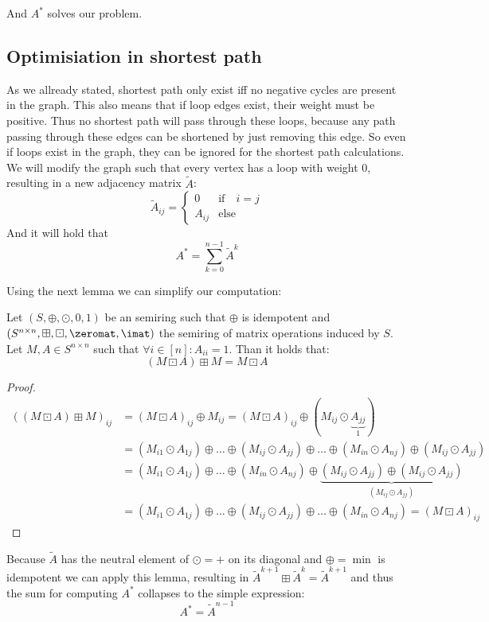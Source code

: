 And $A^*$ solves our problem.

\subsection{Optimisiation in shortest path}
As we allready stated, shortest path only exist iff no negative cycles are present in the graph. This also means that if loop edges exist, their weight must be positive. Thus no shortest path will pass through these loops, because any path passing through these edges can be shortened by just removing this edge. So even if loops exist in the graph, they can be ignored for the shortest path calculations. We will modify the graph such that every vertex has a loop with weight 0, resulting in a new adjacency matrix $\tilde A$:
$$\tilde A_{ij} = \begin{cases}
    0  &\textrm{if}\quad i = j\\
    A_{ij} &\textrm{else}
\end{cases}$$
And it will hold that
$$A^* = \sum_{k=0}^{n-1}\tilde A^k$$

Using the next lemma we can simplify our computation:
\begin{lemma}
    Let $(S, \oplus, \odot, 0, 1)$ be an semiring such that $\oplus$ is idempotent and $(S^{n \times n}, \boxplus, \boxdot, \zeromat, \imat)$ the semiring of matrix operations induced by $S$. Let $M, A \in S^{n \times n}$ such that $\forall i \in [n]: A_{ii} = 1$. Than it holds that:
    $$(M \boxdot A) \boxplus M = M \boxdot A$$ 
\end{lemma}
\begin{proof}
    \begin{align*}
        ((M\boxdot A) \boxplus M)_{ij} &= (M\boxdot A)_{ij} \oplus M_{ij} = (M\boxdot A)_{ij} \oplus( M_{ij} \odot \underbrace{A_{jj}}_1)\\
        &= (M_{i1} \odot A_{1j}) \oplus \dots \oplus (M_{ij} \odot A_{jj}) \oplus \dots \oplus (M_{in} \odot A_{nj}) \oplus (M_{ij} \odot A_{jj})\\
        &= (M_{i1} \odot A_{1j}) \oplus \dots \oplus (M_{in} \odot A_{nj}) \oplus \underbrace{(M_{ij} \odot A_{jj}) \oplus (M_{ij} \odot A_{jj})}_{(M_{ij} \odot A_{jj})}\\
        &= (M_{i1} \odot A_{1j}) \oplus \dots \oplus (M_{ij} \odot A_{jj}) \oplus \dots \oplus (M_{in} \odot A_{nj}) = (M \boxdot A)_{ij}
    \end{align*}
\end{proof}
Because $\tilde A$ has the neutral element of $\odot = +$ on its diagonal and $\oplus = \min$ is idempotent we can apply this lemma, resulting in $\tilde A^{k+1} \boxplus \tilde A^k = \tilde A^{k+1}$ and thus the sum for computing $A^*$ collapses to the simple expression:
$$A^* = \tilde A^{n-1}$$

